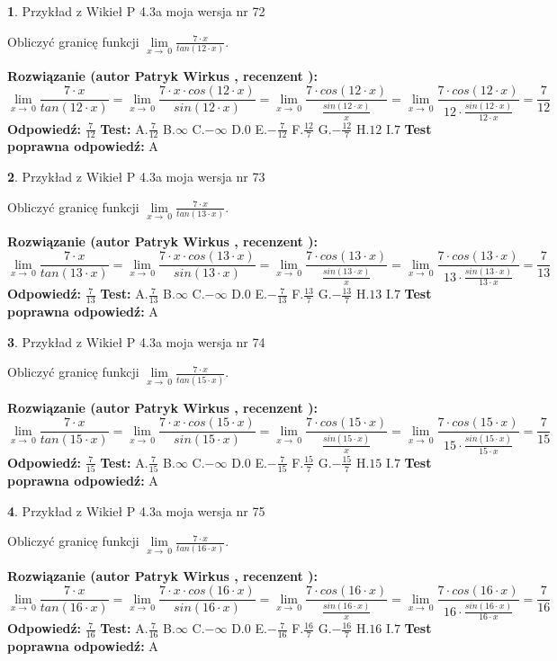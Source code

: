\documentclass[12pt, a4paper]{article}
\theoremstyle{definition} %
\newtheorem{zad}{}
\newcommand{\zadStart}[1]{\begin{zad}#1\newline}
\newcommand{\zadStop}{\end{zad}}
\newcommand{\rozwStart}[2]{\noindent \textbf{Rozwiązanie (autor #1 , recenzent #2): }\newline}
\newcommand{\rozwStop}{\newline}
\newcommand{\odpStart}{\noindent \textbf{Odpowiedź:}\newline}
\newcommand{\odpStop}{\newline}
\newcommand{\testStart}{\noindent \textbf{Test:}\newline}
\newcommand{\testStop}{\newline}
\newcommand{\kluczStart}{\noindent \textbf{Test poprawna odpowiedź:}\newline}
\newcommand{\kluczStop}{\newline}
\begin{document}
\zadStart{Przykład z Wikieł P 4.3a moja wersja nr 72}


Obliczyć granicę funkcji $\lim\limits_{x\to\ 0}\frac{7 \cdot x}{tan(12 \cdot x)}$.
\zadStop
\rozwStart{Patryk Wirkus}{}
$$\lim\limits_{x\to\ 0}\frac{7 \cdot x}{tan(12 \cdot x)}=\lim\limits_{x\to\ 0}\frac{7 \cdot x \cdot cos(12 \cdot x)}{sin(12 \cdot x)}=\lim\limits_{x\to\ 0}\frac{7 \cdot cos(12 \cdot x)}{\frac{sin(12 \cdot x)}{x}}=\lim\limits_{x\to\ 0}\frac{7 \cdot cos(12 \cdot x)}{12 \cdot \frac{sin(12 \cdot x)}{12 \cdot x}} = \frac{7}{12}$$
\rozwStop
\odpStart
$\frac{7}{12}$
\odpStop
\testStart
A.$\frac{7}{12}$
B.$\infty$
C.$-\infty$
D.$0$
E.$-\frac{7}{12}$
F.$\frac{12}{7}$
G.$-\frac{12}{7}$
H.$12$
I.$7$
\testStop
\kluczStart
A
\kluczStop



\zadStart{Przykład z Wikieł P 4.3a moja wersja nr 73}


Obliczyć granicę funkcji $\lim\limits_{x\to\ 0}\frac{7 \cdot x}{tan(13 \cdot x)}$.
\zadStop
\rozwStart{Patryk Wirkus}{}
$$\lim\limits_{x\to\ 0}\frac{7 \cdot x}{tan(13 \cdot x)}=\lim\limits_{x\to\ 0}\frac{7 \cdot x \cdot cos(13 \cdot x)}{sin(13 \cdot x)}=\lim\limits_{x\to\ 0}\frac{7 \cdot cos(13 \cdot x)}{\frac{sin(13 \cdot x)}{x}}=\lim\limits_{x\to\ 0}\frac{7 \cdot cos(13 \cdot x)}{13 \cdot \frac{sin(13 \cdot x)}{13 \cdot x}} = \frac{7}{13}$$
\rozwStop
\odpStart
$\frac{7}{13}$
\odpStop
\testStart
A.$\frac{7}{13}$
B.$\infty$
C.$-\infty$
D.$0$
E.$-\frac{7}{13}$
F.$\frac{13}{7}$
G.$-\frac{13}{7}$
H.$13$
I.$7$
\testStop
\kluczStart
A
\kluczStop



\zadStart{Przykład z Wikieł P 4.3a moja wersja nr 74}


Obliczyć granicę funkcji $\lim\limits_{x\to\ 0}\frac{7 \cdot x}{tan(15 \cdot x)}$.
\zadStop
\rozwStart{Patryk Wirkus}{}
$$\lim\limits_{x\to\ 0}\frac{7 \cdot x}{tan(15 \cdot x)}=\lim\limits_{x\to\ 0}\frac{7 \cdot x \cdot cos(15 \cdot x)}{sin(15 \cdot x)}=\lim\limits_{x\to\ 0}\frac{7 \cdot cos(15 \cdot x)}{\frac{sin(15 \cdot x)}{x}}=\lim\limits_{x\to\ 0}\frac{7 \cdot cos(15 \cdot x)}{15 \cdot \frac{sin(15 \cdot x)}{15 \cdot x}} = \frac{7}{15}$$
\rozwStop
\odpStart
$\frac{7}{15}$
\odpStop
\testStart
A.$\frac{7}{15}$
B.$\infty$
C.$-\infty$
D.$0$
E.$-\frac{7}{15}$
F.$\frac{15}{7}$
G.$-\frac{15}{7}$
H.$15$
I.$7$
\testStop
\kluczStart
A
\kluczStop



\zadStart{Przykład z Wikieł P 4.3a moja wersja nr 75}


Obliczyć granicę funkcji $\lim\limits_{x\to\ 0}\frac{7 \cdot x}{tan(16 \cdot x)}$.
\zadStop
\rozwStart{Patryk Wirkus}{}
$$\lim\limits_{x\to\ 0}\frac{7 \cdot x}{tan(16 \cdot x)}=\lim\limits_{x\to\ 0}\frac{7 \cdot x \cdot cos(16 \cdot x)}{sin(16 \cdot x)}=\lim\limits_{x\to\ 0}\frac{7 \cdot cos(16 \cdot x)}{\frac{sin(16 \cdot x)}{x}}=\lim\limits_{x\to\ 0}\frac{7 \cdot cos(16 \cdot x)}{16 \cdot \frac{sin(16 \cdot x)}{16 \cdot x}} = \frac{7}{16}$$
\rozwStop
\odpStart
$\frac{7}{16}$
\odpStop
\testStart
A.$\frac{7}{16}$
B.$\infty$
C.$-\infty$
D.$0$
E.$-\frac{7}{16}$
F.$\frac{16}{7}$
G.$-\frac{16}{7}$
H.$16$
I.$7$
\testStop
\kluczStart
A
\kluczStop
\end{document}
